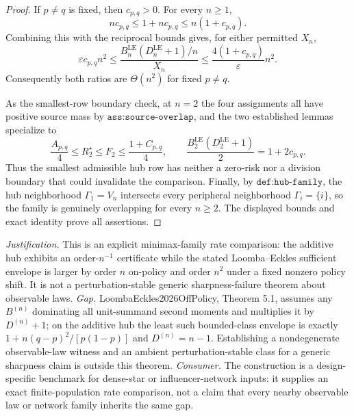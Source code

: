 \documentclass{article}
\begin{document}
\begin{proof}
If \(p\ne q\) is fixed, then \(c_{p,q}>0\).  For every \(n\ge1\),
\[
 n c_{p,q}\le 1+n c_{p,q}\le n(1+c_{p,q}).
\]
Combining this with the reciprocal bounds gives, for either permitted \(X_n\),
\[
 \varepsilon c_{p,q}n^2
 \le
 \frac{B_n^{\mathrm{LE}}(D_n^{\mathrm{LE}}+1)/n}{X_n}
 \le
 \frac{4(1+c_{p,q})}{\varepsilon}n^2.
\]
Consequently both ratios are \(\Theta(n^2)\) for fixed \(p\ne q\).

As the smallest-row boundary check, at \(n=2\) the four assignments all have positive source mass by \(\texttt{ass:source-overlap}\), and the two established lemmas specialize to
\[
 \frac{A_{p,q}}4\le R_2^{\star}\le F_2\le\frac{1+C_{p,q}}4,
 \qquad
 \frac{B_2^{\mathrm{LE}}(D_2^{\mathrm{LE}}+1)}2=1+2c_{p,q}.
\]
Thus the smallest admissible hub row has neither a zero-risk nor a division boundary that could invalidate the comparison.  Finally, by \(\texttt{def:hub-family}\), the hub neighborhood \(\Gamma_1=V_n\) intersects every peripheral neighborhood \(\Gamma_i=\{i\}\), so the family is genuinely overlapping for every \(n\ge2\).  The displayed bounds and exact identity prove all assertions.
\end{proof}
\par\smallskip\noindent \textit{Justification.} This is an explicit minimax-family rate comparison: the additive hub exhibits an order-\(n^{-1}\) certificate while the stated Loomba--Eckles sufficient envelope is larger by order \(n\) on-policy and order \(n^2\) under a fixed nonzero policy shift. It is not a perturbation-stable generic sharpness-failure theorem about observable laws. \textit{Gap.} LoombaEckles2026OffPolicy, Theorem 5.1, assumes any \(B^{(n)}\) dominating all unit-summand second moments and multiplies it by \(D^{(n)}+1\); on the additive hub the least such bounded-class envelope is exactly \(1+n(q-p)^2/[p(1-p)]\) and \(D^{(n)}=n-1\). Establishing a nondegenerate observable-law witness and an ambient perturbation-stable class for a generic sharpness claim is outside this theorem. \textit{Consumer.} The construction is a design-specific benchmark for dense-star or influencer-network inputs: it supplies an exact finite-population rate comparison, not a claim that every nearby observable law or network family inherits the same gap.
\end{document}
